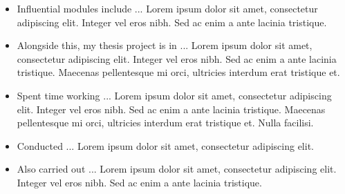 \documentclass[10pt,a4paper,ragged2e,withhyper,normalphoto]{config/altacv}
\begin{document}



\makecvheader
\begin{paracol}{2}

\begin{itemize}
\item Influential modules include ... Lorem ipsum dolor sit amet, consectetur adipiscing elit. Integer vel eros nibh. Sed ac enim a ante lacinia tristique.
\item Alongside this, my thesis project is in ...  Lorem ipsum dolor sit amet, consectetur adipiscing elit. Integer vel eros nibh. Sed ac enim a ante lacinia tristique. Maecenas pellentesque mi orci, ultricies interdum erat tristique et.
\end{itemize}


\begin{itemize}
\item Spent time working ... Lorem ipsum dolor sit amet, consectetur adipiscing elit. Integer vel eros nibh. Sed ac enim a ante lacinia tristique. Maecenas pellentesque mi orci, ultricies interdum erat tristique et. Nulla facilisi. 
\item Conducted ... Lorem ipsum dolor sit amet, consectetur adipiscing elit. 
\item Also carried out ... Lorem ipsum dolor sit amet, consectetur adipiscing elit. Integer vel eros nibh. Sed ac enim a ante lacinia tristique. 
\end{itemize}


\end{paracol}
\end{document}
